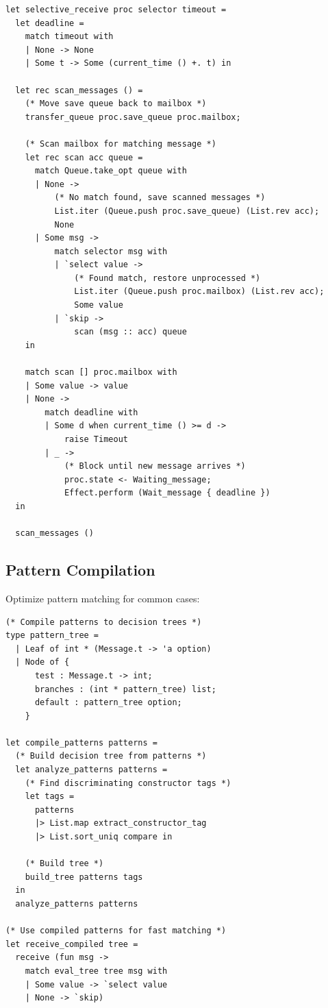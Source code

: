 \documentclass[12pt,a4paper]{report}
\begin{document}
\begin{lstlisting}
let selective_receive proc selector timeout =
  let deadline = 
    match timeout with
    | None -> None
    | Some t -> Some (current_time () +. t) in
  
  let rec scan_messages () =
    (* Move save queue back to mailbox *)
    transfer_queue proc.save_queue proc.mailbox;
    
    (* Scan mailbox for matching message *)
    let rec scan acc queue =
      match Queue.take_opt queue with
      | None ->
          (* No match found, save scanned messages *)
          List.iter (Queue.push proc.save_queue) (List.rev acc);
          None
      | Some msg ->
          match selector msg with
          | `select value ->
              (* Found match, restore unprocessed *)
              List.iter (Queue.push proc.mailbox) (List.rev acc);
              Some value
          | `skip ->
              scan (msg :: acc) queue
    in
    
    match scan [] proc.mailbox with
    | Some value -> value
    | None ->
        match deadline with
        | Some d when current_time () >= d ->
            raise Timeout
        | _ ->
            (* Block until new message arrives *)
            proc.state <- Waiting_message;
            Effect.perform (Wait_message { deadline })
  in
  
  scan_messages ()
\end{lstlisting}

\subsection{Pattern Compilation}

Optimize pattern matching for common cases:

\begin{lstlisting}
(* Compile patterns to decision trees *)
type pattern_tree =
  | Leaf of int * (Message.t -> 'a option)
  | Node of {
      test : Message.t -> int;
      branches : (int * pattern_tree) list;
      default : pattern_tree option;
    }

let compile_patterns patterns =
  (* Build decision tree from patterns *)
  let analyze_patterns patterns =
    (* Find discriminating constructor tags *)
    let tags = 
      patterns 
      |> List.map extract_constructor_tag
      |> List.sort_uniq compare in
    
    (* Build tree *)
    build_tree patterns tags
  in
  analyze_patterns patterns

(* Use compiled patterns for fast matching *)
let receive_compiled tree =
  receive (fun msg ->
    match eval_tree tree msg with
    | Some value -> `select value  
    | None -> `skip)
\end{lstlisting}
\end{document}
